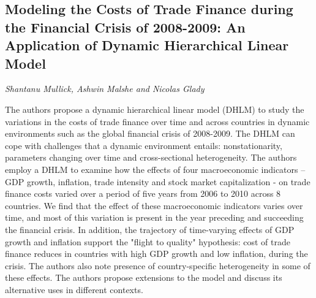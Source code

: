 \documentclass[../booklet.tex]{subfiles}
\begin{document}
\subsection[Modeling the Costs of Trade Finance during the Financial Crisis of 2008-2009: An Application of Dynamic Hierarchical Linear Model. {\it Shantanu Mullick, Ashwin Malshe and Nicolas Glady}]{Modeling the Costs of Trade Finance during the Financial Crisis of 2008-2009: An Application of Dynamic Hierarchical Linear Model}
  

\begin{center}
  {\it Shantanu Mullick, Ashwin Malshe and Nicolas Glady}
\end{center}


The authors propose a dynamic hierarchical linear model (DHLM) to study the variations in the costs of trade finance over time and across countries in dynamic environments such as the global financial crisis of 2008-2009. The DHLM can cope with challenges that a dynamic environment entails: nonstationarity, parameters changing over time and cross-sectional heterogeneity. The authors employ a DHLM to examine how the effects of four macroeconomic indicators -- GDP growth, inflation, trade intensity and stock market capitalization - on trade finance costs varied over a period of five years from 2006 to 2010 across 8 countries. We find that the effect of these macroeconomic indicators varies over time, and most of this variation is present in the year preceding and succeeding the financial crisis. In addition, the trajectory of time-varying effects of GDP growth and inflation support the "flight to quality" hypothesis: cost of trade finance reduces in countries with high GDP growth and low inflation, during the crisis. The authors also note presence of country-specific heterogeneity in some of these effects. The authors propose extensions to the model and discuss its alternative uses in different contexts.

\end{document}
